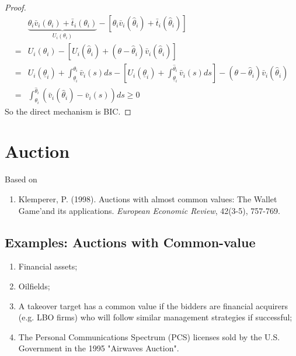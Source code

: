 \documentclass[11pt]{elegantbook}
\begin{document}
\begin{proof}
    \begin{equation}
        \begin{aligned}
            &\underbrace{\theta_i \bar{v}_i(\theta_i)+\bar{t}_i(\theta_i)}_{U_i(\theta_i)}-\left[\theta_i \bar{v}_i(\hat{\theta}_i)+\bar{t}_i(\hat{\theta}_i)\right]\\
            =&U_i(\theta_i)-\left[U_i(\hat{\theta}_i)+(\theta-\hat{\theta}_i)\bar{v}_i(\hat{\theta}_i)\right]\\
            =&U_i(\underline{\theta}_i)+\int_{\underline{\theta}_i}^{\theta_i}\bar{v}_i(s)ds-[U_i(\underline{\theta}_i)+\int_{\underline{\theta}_i}^{\hat{\theta}_i}\bar{v}_i(s)ds]-(\theta-\hat{\theta}_i)\bar{v}_i(\hat{\theta}_i)\\
            =&\int_{\theta_i}^{\hat{\theta}_i}(\bar{v}_i(\hat{\theta}_i)-\bar{v}_i(s))ds\geq 0
        \end{aligned}
        \nonumber
    \end{equation}
    So the direct mechanism is BIC.
\end{proof}

\section{Auction}
Based on
\begin{enumerate}[$\circ$]
    \item Klemperer, P. (1998). Auctions with almost common values: The Wallet Game'and its applications. \textit{European Economic Review}, 42(3-5), 757-769.
\end{enumerate}


\subsection{Examples: Auctions with Common-value}
\begin{enumerate}[(1).]
    \item Financial assets;
    \item Oilfields;
    \item A takeover target has a common value if the bidders are financial acquirers (e.g. LBO firms) who will follow similar management strategies if successful;
    \item The Personal Communications Spectrum (PCS) licenses sold by the U.S. Government in the 1995 "Airwaves Auction".
\end{enumerate}
\end{document}
